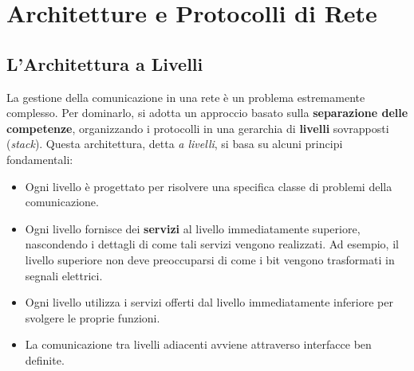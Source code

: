 

\chapter{Architetture e Protocolli di Rete}
\section{L'Architettura a Livelli}
La gestione della comunicazione in una rete è un problema estremamente complesso. Per dominarlo, si adotta un approccio basato sulla \textbf{separazione delle competenze}, organizzando i protocolli in una gerarchia di \textbf{livelli} sovrapposti (\textit{stack}).
Questa architettura, detta \textit{a livelli}, si basa su alcuni principi fondamentali:
\begin{itemize}
    \item Ogni livello è progettato per risolvere una specifica classe di problemi della comunicazione.
    \item Ogni livello fornisce dei \textbf{servizi} al livello immediatamente superiore, nascondendo i dettagli di come tali servizi vengono realizzati. Ad esempio, il livello superiore non deve preoccuparsi di come i bit vengono trasformati in segnali elettrici.
    \item Ogni livello utilizza i servizi offerti dal livello immediatamente inferiore per svolgere le proprie funzioni.
    \item La comunicazione tra livelli adiacenti avviene attraverso interfacce ben definite.
\end{itemize}

